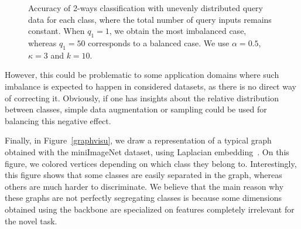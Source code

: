 \documentclass[a4paper,conference]{IEEEtran}
\begin{document}
\begin{figure}[h]
  \begin{center}
  \end{center}
  \vspace{-.5cm}
  \caption{Accuracy of 2-ways classification with unevenly distributed query data for each class, where the total number of query inputs remains constant. When $q_1=1$, we obtain the most imbalanced case, whereas $q_1=50$ corresponds to a balanced case. We use $\alpha=0.5$, $\kappa=3$ and $k=10$.}
  \label{fig:imbalanced}
\end{figure}
However, this could be problematic to some application domains where such imbalance is expected to happen in considered datasets, as there is no direct way of correcting it. Obviously, if one has insights about the relative distribution between classes, simple data augmentation or sampling could be used for balancing this negative effect.

Finally, in Figure~\ref{graphvisu}, we draw a representation of a typical graph obtained with the miniImageNet dataset, using Laplacian embedding~\cite{horaud2009short,shuman2013emerging}. On this figure, we colored vertices depending on which class they belong to. Interestingly, this figure shows that some classes are easily separated in the graph, whereas others are much harder to discriminate. We believe that the main reason why these graphs are not perfectly segregating classes is because some dimensions obtained using the backbone are specialized on features completely irrelevant for the novel task.
\end{document}
